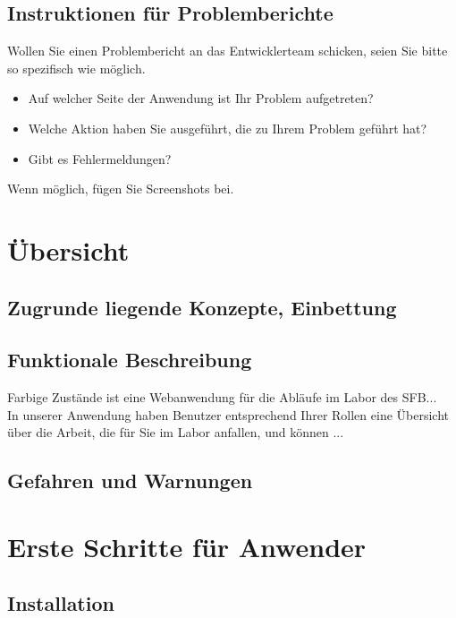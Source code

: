 \documentclass[enabledeprecatedfontcommands,fontsize=12pt,paper=a4,twoside]{scrartcl}
\begin{document}
\subsection{Instruktionen für Problemberichte}
Wollen Sie einen Problembericht an das Entwicklerteam schicken, seien Sie bitte so spezifisch wie möglich. 
\begin{itemize}
\item Auf welcher Seite der Anwendung ist Ihr Problem aufgetreten?
\item Welche Aktion haben Sie ausgeführt, die zu Ihrem Problem geführt hat?
\item Gibt es Fehlermeldungen? 
\end{itemize}
Wenn möglich, fügen Sie Screenshots bei. \\


\newpage
\section{Übersicht}
\subsection{Zugrunde liegende Konzepte, Einbettung}
\subsection{Funktionale Beschreibung}
Farbige Zustände ist eine Webanwendung für die Abläufe im Labor des SFB...\\
In unserer Anwendung haben Benutzer entsprechend Ihrer Rollen eine Übersicht über die Arbeit, die für Sie im Labor anfallen, und können ... \\
\subsection{Gefahren und Warnungen}


\newpage
\section{Erste Schritte für Anwender}

\subsection{Installation}
\end{document}
